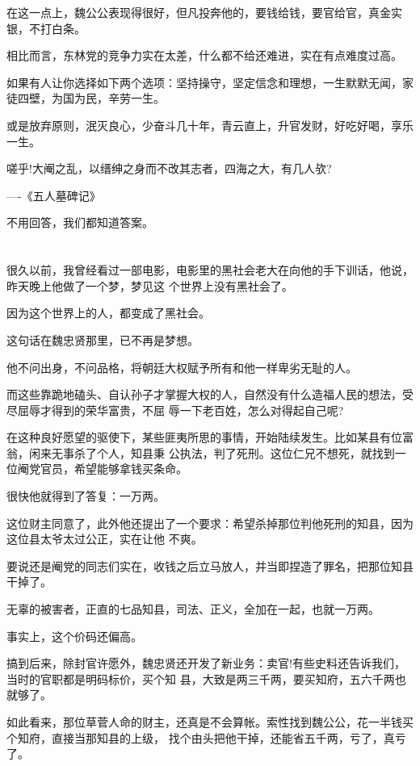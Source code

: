 \documentclass[11pt,a4paper,onecolumn]{article}
\begin{document}
在这一点上，魏公公表现得很好，但凡投奔他的，要钱给钱，要官给官，真金实银，不打白条。

相比而言，东林党的竞争力实在太差，什么都不给还难进，实在有点难度过高。

如果有人让你选择如下两个选项：坚持操守，坚定信念和理想，一生默默无闻，家徒四壁，为国为民，辛劳一生。

或是放弃原则，泯灭良心，少奋斗几十年，青云直上，升官发财，好吃好喝，享乐一生。

嗟乎!大阉之乱，以缙绅之身而不改其志者，四海之大，有几人欤?

----《五人墓碑记》

不用回答，我们都知道答案。

\section[\thesection]{}

很久以前，我曾经看过一部电影，电影里的黑社会老大在向他的手下训话，他说，昨天晚上他做了一个梦，梦见这
个世界上没有黑社会了。

因为这个世界上的人，都变成了黑社会。

这句话在魏忠贤那里，已不再是梦想。

他不问出身，不问品格，将朝廷大权赋予所有和他一样卑劣无耻的人。

而这些靠跪地磕头、自认孙子才掌握大权的人，自然没有什么造福人民的想法，受尽屈辱才得到的荣华富贵，不屈
辱一下老百姓，怎么对得起自己呢?

在这种良好愿望的驱使下，某些匪夷所思的事情，开始陆续发生。比如某县有位富翁，闲来无事杀了个人，知县秉
公执法，判了死刑。这位仁兄不想死，就找到一位阉党官员，希望能够拿钱买条命。

很快他就得到了答复：一万两。

这位财主同意了，此外他还提出了一个要求：希望杀掉那位判他死刑的知县，因为这位县太爷太过公正，实在让他
不爽。

要说还是阉党的同志们实在，收钱之后立马放人，并当即捏造了罪名，把那位知县干掉了。

无辜的被害者，正直的七品知县，司法、正义，全加在一起，也就一万两。

事实上，这个价码还偏高。

搞到后来，除封官许愿外，魏忠贤还开发了新业务：卖官!有些史料还告诉我们，当时的官职都是明码标价，买个知
县，大致是两三千两，要买知府，五六千两也就够了。

如此看来，那位草菅人命的财主，还真是不会算帐。索性找到魏公公，花一半钱买个知府，直接当那知县的上级，
找个由头把他干掉，还能省五千两，亏了，真亏了。
\end{document}
